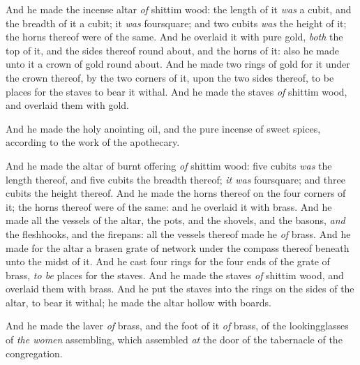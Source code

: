 \documentclass[11pt,letterpaper,oneside]{memoir}
\begin{document}
And he made the incense altar \emph{of} shittim wood: the length of it
\emph{was} a cubit, and the breadth of it a cubit; it \emph{was}
foursquare; and two cubits \emph{was} the height of it; the horns
thereof were of the same. And he overlaid it with pure gold, \emph{both}
the top of it, and the sides thereof round about, and the horns of it:
also he made unto it a crown of gold round about. And he made two rings
of gold for it under the crown thereof, by the two corners of it, upon
the two sides thereof, to be places for the staves to bear it withal.
And he made the staves \emph{of} shittim wood, and overlaid them with
gold.

And he made the holy anointing oil, and the pure incense of sweet
spices, according to the work of the apothecary.

And he made the altar of burnt offering \emph{of} shittim wood: five
cubits \emph{was} the length thereof, and five cubits the breadth
thereof; \emph{it was} foursquare; and three cubits the height thereof.
And he made the horns thereof on the four corners of it; the horns
thereof were of the same: and he overlaid it with brass. And he made all
the vessels of the altar, the pots, and the shovels, and the basons,
\emph{and} the fleshhooks, and the firepans: all the vessels thereof
made he \emph{of} brass. And he made for the altar a brasen grate of
network under the compass thereof beneath unto the midst of it. And he
cast four rings for the four ends of the grate of brass, \emph{to be}
places for the staves. And he made the staves \emph{of} shittim wood,
and overlaid them with brass. And he put the staves into the rings on
the sides of the altar, to bear it withal; he made the altar hollow with
boards.

And he made the laver \emph{of} brass, and the foot of it \emph{of}
brass, of the lookingglasses of \emph{the women} assembling, which
assembled \emph{at} the door of the tabernacle of the congregation.
\end{document}
